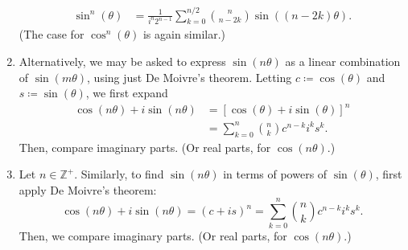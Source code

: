 \documentclass[oneside]{book}
\begin{document}
\begin{note}
\begin{enumerate}
\begin{align*}
      \sin^n(\theta) &= \frac{1}{i^n2^{n-1}}\sum_{k=0}^{n/2}{\binom{n}{n-2k}\sin((n-2k)\theta)}.
    \end{align*}
    (The case for \(\cos^n(\theta)\) is again similar.)
    \item Alternatively, we may be asked to express \(\sin(n\theta)\) as a linear combination of \(\sin(m\theta)\), using just De Moivre's theorem. Letting \(c\coloneq\cos(\theta)\) and \(s\coloneq\sin(\theta)\), we first expand
    \begin{align*}
      \cos(n\theta)+i\sin(n\theta) &= [\cos(\theta)+i\sin(\theta)]^n\\
      &= \sum_{k=0}^{n}{\binom{n}{k}c^{n-k}i^{k}s^{k}}.
    \end{align*}
    Then, compare imaginary parts. (Or real parts, for \(\cos(n\theta)\).)
    \item Let \(n\in \mathbb{Z}^{+}\). Similarly, to find \(\sin(n\theta)\) in terms of powers of \(\sin(\theta)\), first apply De Moivre's theorem:
    \[\cos(n\theta)+i\sin(n\theta)=(c+is)^n=\sum_{k=0}^{n}{\binom{n}{k}c^{n-k}i^ks^k}.\]
    Then, we compare imaginary parts. (Or real parts, for \(\cos(n\theta)\).)
  \end{enumerate}
\end{note}
\end{document}
